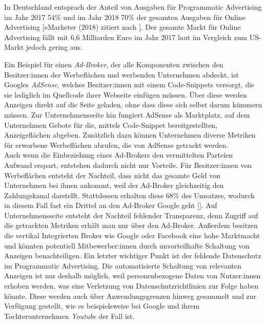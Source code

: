 In Deutschland entsprach der Anteil von Ausgaben für Programmatic Advertising im Jahr 2017 54\% und im Jahr 2018 70\% der gesamten Ausgaben für Online Advertising [eMarketer (2018) zitiert nach \cite[21]{optimity_advisors_2019}]. Der gesamte Markt für Online Advertising fällt mit 6,6 Milliarden Euro im Jahr 2017 laut \cite{optimity_advisors_2019} im Vergleich zum US-Markt jedoch gering aus.

Ein Beispiel für einen \emph{Ad-Broker}, der alle Komponenten zwischen den Besitzer:innen der Werbeflächen und werbenden Unternehmen abdeckt, ist Googles \emph{AdSense}, welches Besitzer:innen mit einem Code-Snippets versorgt, die sie lediglich im Quellcode ihrer Webseite einfügen müssen. Über diese werden Anzeigen direkt auf die Seite geladen, ohne dass diese sich selbst darum kümmern müssen. Zur Unternehmensseite hin fungiert AdSense als Marktplatz, auf dem Unternehmen Gebote für die, mittels Code-Snippet bereitgestellten, Anzeigeflächen abgeben. 
Zusätzlich dazu können Unternehmen diverse Metriken für erworbene Werbeflächen abrufen, die von AdSense getrackt werden. \\

Auch wenn die Einbeziehung eines Ad-Brokers den vermittelten Parteien Aufwand erspart, entstehen dadurch nicht nur Vorteile. 
Für Besitzer:innen von Werbeflächen entsteht der Nachteil, dass nicht das gesamte Geld von Unternehmen bei ihnen ankommt, weil der Ad-Broker gleichzeitig den Zahlungskanal darstellt. 
Stattdessen erhalten diese 68\% des Umsatzes, wodurch in diesem Fall fast ein Drittel an den Ad-Broker Google geht [\cite{google_adsense_2021}]. Auf Unternehmensseite entsteht der Nachteil fehlender Transparenz, denn Zugriff auf die getrackten Metriken erhält man nur über den Ad-Broker. Außerdem besitzen die vertikal Integrierten Broker wie Google oder Facebook eine hohe Marktmacht und könnten potentiell Mitbewerber:innen durch unvorteilhafte Schaltung von Anzeigen benachteiligen. Ein letzter wichtiger Punkt ist der fehlende Datenschutz im Programmatic Advertising. Die automatisierte Schaltung von relevanten Anzeigen ist nur deshalb möglich, weil personenbezogene Daten von Nutzer:innen erhoben werden, was eine Verletzung von Datenschutzrichtlinien zur Folge haben könnte. Diese werden auch über Anwendungsgrenzen hinweg gesammelt und zur Verfügung gestellt, wie es beispielsweise bei Google und ihrem Tochterunternehmen \emph{Youtube} der Fall ist.

